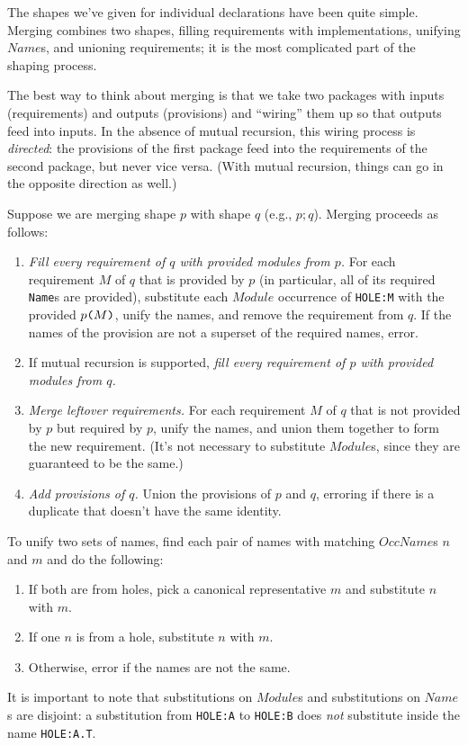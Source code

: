 \documentclass{article}
\newcommand{\I}[1]{\ensuremath{\mathit{#1}}}
\begin{document}
The shapes we've given for individual declarations have been quite
simple.  Merging combines two shapes, filling requirements with
implementations, unifying \I{Name}s, and unioning requirements; it is
the most complicated part of the shaping process.

The best way to think about merging is that we take two packages with
inputs (requirements) and outputs (provisions) and ``wiring'' them up so
that outputs feed into inputs.  In the absence
of mutual recursion, this wiring process is \emph{directed}: the provisions
of the first package feed into the requirements of the second package,
but never vice versa.  (With mutual recursion, things can go in the opposite
direction as well.)

Suppose we are merging shape $p$ with shape $q$ (e.g., $p; q$).  Merging
proceeds as follows:

\begin{enumerate}
    \item \emph{Fill every requirement of $q$ with provided modules from
        $p$.} For each requirement $M$ of $q$ that is provided by $p$ (in particular,
        all of its required \verb|Name|s are provided),
        substitute each \I{Module} occurrence of \verb|HOLE:M| with the
        provided $p\verb|(|M\verb|)|$, unify the names, and remove the requirement from $q$.
        If the names of the provision are not a superset of the required names, error.
    \item If mutual recursion is supported, \emph{fill every requirement of $p$ with provided modules from $q$.}
    \item \emph{Merge leftover requirements.}  For each requirement $M$ of $q$ that is not
        provided by $p$ but required by $p$, unify the names, and union them together to form the new requirement.  (It's not
        necessary to substitute \I{Module}s, since they are guaranteed to be the same.)
    \item \emph{Add provisions of $q$.} Union the provisions of $p$ and $q$, erroring
        if there is a duplicate that doesn't have the same identity.
\end{enumerate}
%
To unify two sets of names, find each pair of names with matching \I{OccName}s $n$ and $m$ and do the following:

\begin{enumerate}
    \item If both are from holes, pick a canonical representative $m$ and substitute $n$ with $m$.
    \item If one $n$ is from a hole, substitute $n$ with $m$.
    \item Otherwise, error if the names are not the same.
\end{enumerate}
%
It is important to note that substitutions on \I{Module}s and substitutions on
\I{Name}s are disjoint: a substitution from \verb|HOLE:A| to \verb|HOLE:B|
does \emph{not} substitute inside the name \verb|HOLE:A.T|.
\end{document}
